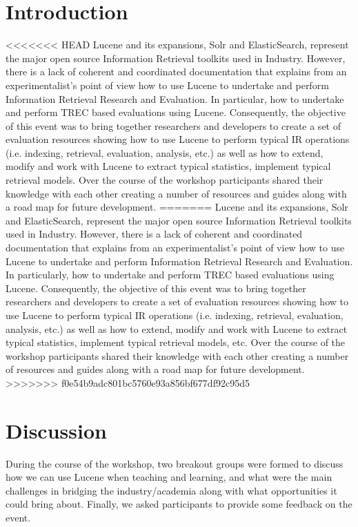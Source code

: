 \documentclass[12pt]{article}
\begin{document}
\begin{sloppypar}
\section{Introduction}
<<<<<<< HEAD
Lucene and its expansions, Solr and ElasticSearch, represent the major open source Information Retrieval toolkits used in Industry. However, there is a lack of coherent and coordinated documentation that explains from an experimentalist's point of view how to use Lucene to undertake and perform Information Retrieval Research and Evaluation. In particular, how to undertake and perform TREC based evaluations using Lucene. Consequently, the objective of this event was to bring together researchers and developers to create a set of evaluation resources showing how to use Lucene to perform typical IR operations (i.e.  indexing, retrieval, evaluation, analysis, etc.) as well as how to extend, modify and work with Lucene to extract typical statistics, implement typical retrieval models. Over the course of the workshop participants shared their knowledge with each other creating a number of resources and guides along with a road map for future development.
=======
Lucene and its expansions, Solr and ElasticSearch, represent the major open source Information Retrieval toolkits used in Industry. However, there is a lack of coherent and coordinated documentation that explains from an experimentalist's point of view how to use Lucene to undertake and perform Information Retrieval Research and Evaluation. In particularly, how to undertake and perform TREC based evaluations using Lucene. Consequently, the objective of this event was to bring together researchers and developers to create a set of evaluation resources showing how to use Lucene to perform typical IR operations (i.e.  indexing, retrieval, evaluation, analysis, etc.) as well as how to extend, modify and work with Lucene to extract typical statistics, implement typical retrieval models, etc. Over the course of the workshop participants shared their knowledge with each other creating a number of resources and guides along with a road map for future development.
>>>>>>> f0e54b9adc801bc5760e93a856bf677df92c95d5






\section{Discussion}
During the course of the workshop, two breakout groups were formed to discuss how we can use Lucene when teaching and learning, and what were the main challenges in bridging the industry/academia along with what opportunities it could bring about. Finally, we asked participants to provide some feedback on the event.




\end{sloppypar}
\end{document}
